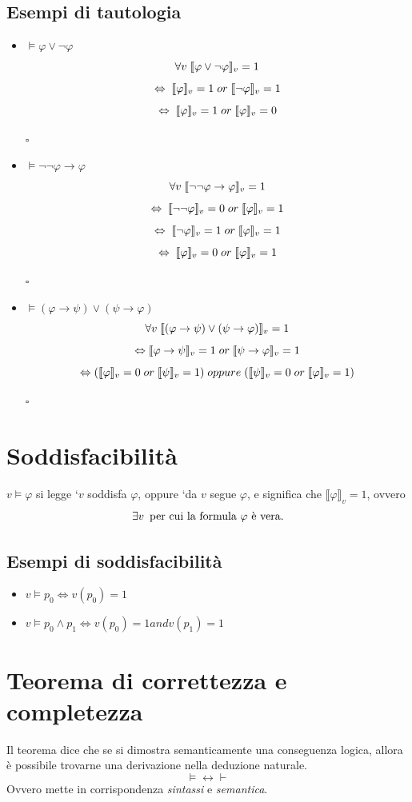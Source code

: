 \documentclass[a4paper,12pt]{report}
\newcommand\val[1]{\llbracket#1\rrbracket}
\newcommand\Iff{\Leftrightarrow}
\newcommand\qed{\begin{flushright}{$\square$}\end{flushright}}
\begin{document}
\subsection{Esempi di tautologia}
\begin{itemize}
\item $\vDash \varphi \lor \neg \varphi$
\[ \forall v \thickspace \val{\varphi \lor \neg \varphi}_v = 1 \]
\[ \Leftrightarrow \thickspace \val{\varphi}_v = 1 \thickspace or \thickspace \val{\neg \varphi}_v = 1 \]
\[ \Leftrightarrow \thickspace \val{\varphi}_v = 1 \thickspace or \thickspace \val{\varphi}_v = 0 \] \qed
\item $\vDash \neg\neg \varphi \to \varphi$
\[ \forall v \thickspace \val{\neg\neg \varphi \to \varphi}_v = 1 \]
\[ \Iff \thickspace \val{\neg\neg\varphi}_v = 0 \thickspace or \thickspace \val{\varphi}_v = 1 \]
\[ \Iff \thickspace \val{\neg \varphi}_v = 1 \thickspace or \thickspace \val{\varphi}_v = 1 \]
\[ \Iff \thickspace \val{\varphi}_v = 0 \thickspace or \thickspace \val{\varphi}_v = 1 \] \qed
\item $\vDash (\varphi \to \psi) \lor (\psi \to \varphi)$
\[ \forall v \thickspace \val{(\varphi \to \psi) \lor (\psi \to \varphi)}_v = 1 \]
\[ \Iff \val{\varphi \to \psi}_v = 1 \thickspace or \thickspace \val{\psi \to \varphi}_v = 1 \]
\[ \Iff (\val{\varphi}_v = 0 \thickspace or \thickspace \val{\psi}_v = 1) \thickspace oppure \thickspace (\val{\psi}_v = 0 \thickspace or \thickspace \val{\varphi}_v = 1) \]
\qed
\end{itemize}

\section{Soddisfacibilit\`{a}}
$v \vDash \varphi$ si legge `$v$ soddisfa $\varphi$, oppure `da $v$ segue $\varphi$, e significa che $\val{\varphi}_v = 1 $, ovvero
\[ \exists v \thinspace\text{ per cui la formula $\varphi$ \`{e} vera.} \]
\subsection{Esempi di soddisfacibilit\`{a}}
\begin{itemize}
\item $v \vDash p_0 \Iff v(p_0)=1$
\item $v \vDash p_0 \wedge p_1 \Iff v(p_0) = 1 and v(p_1) = 1$
\end{itemize}

\section{Teorema di correttezza e completezza}
Il teorema dice che se si dimostra semanticamente una conseguenza logica, allora \`{e} possibile trovarne una derivazione nella deduzione naturale.
\[ \vDash \leftrightarrow \vdash \]
Ovvero mette in corrispondenza \emph{sintassi} e \emph{semantica}.
\newpage
\end{document}

